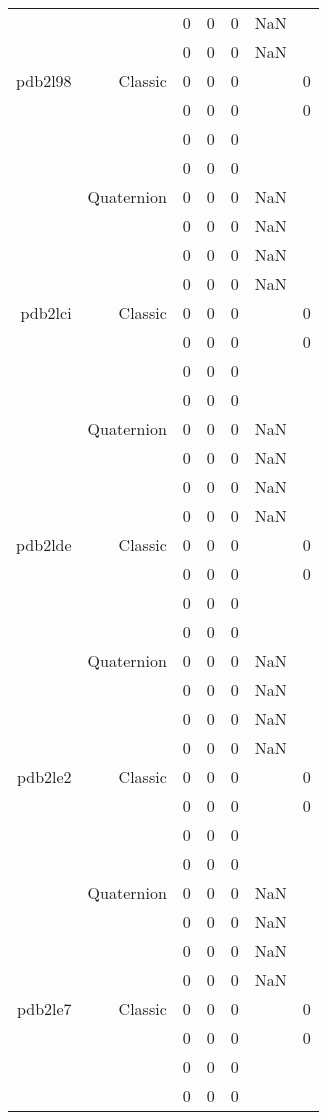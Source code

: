 \begin{xltabular}{\textwidth}{r|rcccSc}
& & 0 & 0 & 0 & NaN & \\
& & 0 & 0 & 0 & NaN & \\ \addlinespace
pdb2l98 & Classic & 0 & 0 & 0 & & 0 \\
& & 0 & 0 & 0 & & 0 \\
& & 0 & 0 & 0 & & \\
& & 0 & 0 & 0 & & \\
& Quaternion & 0 & 0 & 0 & NaN & \\
& & 0 & 0 & 0 & NaN & \\
& & 0 & 0 & 0 & NaN & \\
& & 0 & 0 & 0 & NaN & \\ \addlinespace
pdb2lci & Classic & 0 & 0 & 0 & & 0 \\
& & 0 & 0 & 0 & & 0 \\
& & 0 & 0 & 0 & & \\
& & 0 & 0 & 0 & & \\
& Quaternion & 0 & 0 & 0 & NaN & \\
& & 0 & 0 & 0 & NaN & \\
& & 0 & 0 & 0 & NaN & \\
& & 0 & 0 & 0 & NaN & \\ \addlinespace
pdb2lde & Classic & 0 & 0 & 0 & & 0 \\
& & 0 & 0 & 0 & & 0 \\
& & 0 & 0 & 0 & & \\
& & 0 & 0 & 0 & & \\
& Quaternion & 0 & 0 & 0 & NaN & \\
& & 0 & 0 & 0 & NaN & \\
& & 0 & 0 & 0 & NaN & \\
& & 0 & 0 & 0 & NaN & \\ \addlinespace
pdb2le2 & Classic & 0 & 0 & 0 & & 0 \\
& & 0 & 0 & 0 & & 0 \\
& & 0 & 0 & 0 & & \\
& & 0 & 0 & 0 & & \\
& Quaternion & 0 & 0 & 0 & NaN & \\
& & 0 & 0 & 0 & NaN & \\
& & 0 & 0 & 0 & NaN & \\
& & 0 & 0 & 0 & NaN & \\ \addlinespace
pdb2le7 & Classic & 0 & 0 & 0 & & 0 \\
& & 0 & 0 & 0 & & 0 \\
& & 0 & 0 & 0 & & \\
& & 0 & 0 & 0 & & \\

\end{xltabular}
